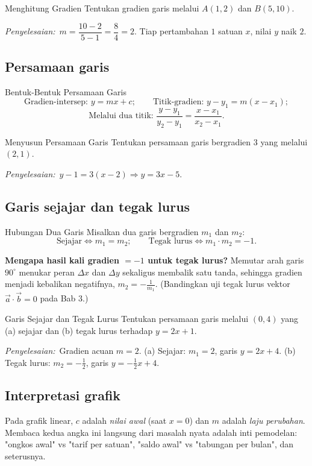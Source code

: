 \documentclass[11pt,a4paper]{report}
\theoremstyle{gaya}
\newcommand{\jawab}{\par\smallskip\noindent\textit{\textcolor{oranye}{Penyelesaian:}}\ }
\begin{document}
\begin{contoh}{Menghitung Gradien}
Tentukan gradien garis melalui $A(1,2)$ dan $B(5,10)$.

\jawab $m=\dfrac{10-2}{5-1}=\dfrac{8}{4}=2$. Tiap pertambahan $1$ satuan $x$, nilai $y$ naik $2$.
\end{contoh}

\subsection*{Persamaan garis}
\begin{konsep}{Bentuk-Bentuk Persamaan Garis}
\[
\text{Gradien-intersep: } y=mx+c;\qquad
\text{Titik-gradien: } y-y_1=m(x-x_1);
\]
\[
\text{Melalui dua titik: } \frac{y-y_1}{y_2-y_1}=\frac{x-x_1}{x_2-x_1}.
\]
\end{konsep}

\begin{contoh}{Menyusun Persamaan Garis}
Tentukan persamaan garis bergradien $3$ yang melalui $(2,1)$.

\jawab $y-1=3(x-2)\Rightarrow y=3x-5$.
\end{contoh}

\subsection*{Garis sejajar dan tegak lurus}
\begin{konsep}{Hubungan Dua Garis}
Misalkan dua garis bergradien $m_1$ dan $m_2$:
\[
\text{Sejajar} \iff m_1=m_2;\qquad
\text{Tegak lurus} \iff m_1\cdot m_2=-1.
\]
\end{konsep}

\textbf{Mengapa hasil kali gradien $=-1$ untuk tegak lurus?} Memutar arah garis $90^\circ$ menukar peran $\Delta x$ dan $\Delta y$ sekaligus membalik satu tanda, sehingga gradien menjadi kebalikan negatifnya, $m_2=-\tfrac{1}{m_1}$. (Bandingkan uji tegak lurus vektor $\vec a\cdot\vec b=0$ pada Bab 3.)

\begin{contoh}{Garis Sejajar dan Tegak Lurus}
Tentukan persamaan garis melalui $(0,4)$ yang (a) sejajar dan (b) tegak lurus terhadap $y=2x+1$.

\jawab Gradien acuan $m=2$. (a) Sejajar: $m_1=2$, garis $y=2x+4$. (b) Tegak lurus: $m_2=-\tfrac12$, garis $y=-\tfrac12 x+4$.
\end{contoh}

\subsection*{Interpretasi grafik}
Pada grafik linear, $c$ adalah \emph{nilai awal} (saat $x=0$) dan $m$ adalah \emph{laju perubahan}. Membaca kedua angka ini langsung dari masalah nyata adalah inti pemodelan: "ongkos awal" vs "tarif per satuan", "saldo awal" vs "tabungan per bulan", dan seterusnya.
\end{document}
